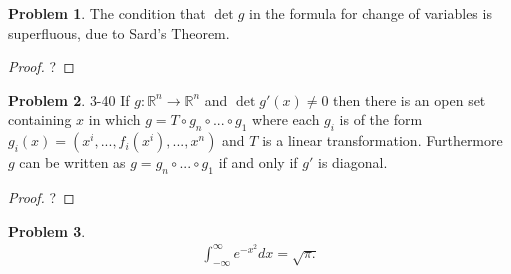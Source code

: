 \documentclass[20pt]{article}
\theoremstyle{plain}
\theoremstyle{definition}
\newtheorem*{problem}{Problem}
\newcommand{\reals}{\mathbb{R}}
\begin{document}
\begin{problem}{3.39}
  The condition that $\det g$ in the formula for change of variables is
  superfluous, due to Sard's Theorem.
\end{problem}
\begin{proof}
  \color{ForestGreen} ?
\end{proof}



\begin{problem}{3-40}
  If $g: \reals^n \to \reals^n$ and $\det g'(x) \neq 0$ then 
  there is an open set containing $x$ in which 
  $g = T \circ g_n \circ ... \circ g_1$ where each $g_i$
  is of the form $g_i(x) = (x^i, ..., f_i(x^i), ..., x^n)$
  and $T$ is a linear transformation.  Furthermore $g$ can be written as $g = g_n \circ...\circ g_1$ if and only if $g'$ is 
  diagonal.
\end{problem}

\begin{proof}
  \color{ForestGreen} ?
\end{proof}

\begin{problem}
  \begin{align*}
    \int_{-\infty}^\infty e^{-x^2}dx = \sqrt{\pi.}
  \end{align*}
\end{problem}
\end{document}
